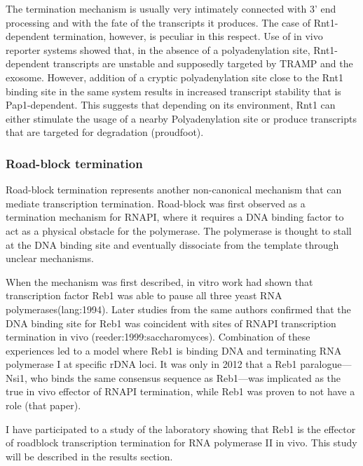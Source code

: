 The termination mechanism is usually very intimately connected with 3’ end processing and with the fate of the transcripts it produces. The case of Rnt1-dependent termination, however, is peculiar in this respect.
Use of in vivo reporter systems showed that, in the absence of a polyadenylation site, Rnt1-dependent transcripts are unstable and supposedly targeted by TRAMP and the exosome. 
However, addition of a cryptic polyadenylation site close to the Rnt1 binding site in the same system results in increased transcript stability that is Pap1-dependent. 
This suggests that depending on its environment, Rnt1 can either stimulate the usage of a nearby Polyadenylation site or produce transcripts that are targeted for degradation (proudfoot).

\subsubsection{Road-block termination}
  
Road-block termination represents another non-canonical mechanism that can mediate transcription termination. 
Road-block was first observed as a termination mechanism for RNAPI, where it requires a DNA binding factor to act as a physical obstacle for the polymerase. 
The polymerase is thought to stall at the DNA binding site and eventually dissociate from the template through unclear mechanisms. 

When the mechanism was first described, in vitro work had shown that transcription factor Reb1 was able to pause all three yeast RNA polymerases(lang:1994). 
Later studies from the same authors confirmed that the DNA binding site for Reb1 was coincident with sites of RNAPI transcription termination in vivo (reeder:1999:saccharomyces). 
Combination of these experiences led to a model where Reb1 is binding DNA and terminating RNA polymerase I at specific rDNA loci. 
It was only in 2012 that a Reb1 paralogue—Nsi1, who binds the same consensus sequence as Reb1—was implicated as the true in vivo effector of RNAPI termination, while Reb1 was proven to not have a role (that paper). 

I have participated to a study of the laboratory showing that Reb1 is the effector of roadblock transcription termination for RNA polymerase II in vivo. 
This study will be described in the results section.

\clearpage